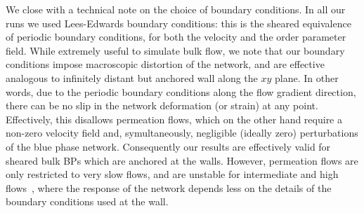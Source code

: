 \documentclass[aps,pre,reprint,superscriptaddress, twocolumn]{revtex4}
\begin{document}
We close with a technical note on the choice of boundary conditions. 
In all our runs we used Lees-Edwards boundary conditions: this
is the sheared equivalence of periodic boundary conditions, for both the 
velocity and the order parameter field. 
While extremely useful to simulate bulk flow, we
note that our boundary conditions impose macroscopic distortion
of the network, and are effective analogous to infinitely distant
but anchored wall along the $xy$ plane. In other words, due to
the periodic boundary conditions along the flow gradient direction, 
there can be no slip in the network deformation (or strain) at any point. 
Effectively, this disallows permeation flows, which on the other
hand require a non-zero velocity field and, symultaneously,
negligible (ideally zero) perturbations of the blue phase network.
Consequently our results are effectively valid for sheared bulk 
BPs which are anchored at the walls. However, permeation flows are 
only restricted to very slow flows, and are unstable for intermediate 
and high flows~\cite{Dupuis:2005}, 
where the response of the network depends less on
the details of the boundary conditions used at the wall.
\newpage




\end{document}
